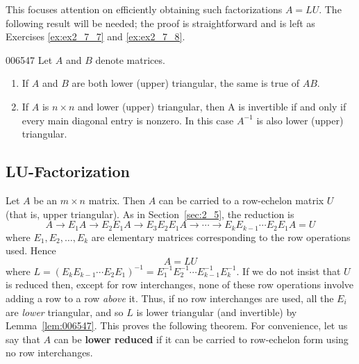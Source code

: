 This focuses attention on efficiently obtaining such factorizations $A = LU$. The following result will be needed; the proof is straightforward and is left as Exercises \ref{ex:ex2_7_7} and \ref{ex:ex2_7_8}. 

\begin{lemma}{}{006547}
Let $A$ and $B$ denote matrices.

\begin{enumerate}
\item If $A$ and $B$ are both lower (upper) triangular, the same is true of $AB$.

\item If $A$ is $n \times n$ and lower (upper) triangular, then A is invertible if and only if every main diagonal entry is nonzero. In this case $A^{-1}$ is also lower (upper) triangular.

\end{enumerate}
\end{lemma}

\subsection*{LU-Factorization}

Let $A$ be an $m \times n$ matrix. Then $A$ can be carried to a row-echelon matrix $U$ (that is, upper triangular). As in Section~\ref{sec:2_5}, the reduction is
\begin{equation*}
A \rightarrow E_{1}A \rightarrow E_{2}E_{1}A \rightarrow E_{3}E_{2}E_{1}A \rightarrow \cdots \rightarrow E_{k}E_{k-1} \cdots E_{2}E_{1}A = U
\end{equation*}
where $E_{1}, E_{2}, \dots, E_{k}$ are elementary matrices corresponding to the row operations used. Hence
\begin{equation*}
A = LU
\end{equation*}
where $L = \left(E_{k}E_{k-1} \cdots E_{2}E_{1}\right)^{-1} = E_{1}^{-1}E_{2}^{-1} \cdots E_{k-1}^{-1}E_{k}^{-1}$. If we do not insist that $U$ is reduced then, except for row interchanges, none of these row operations involve adding a row to a row \textit{above} it. Thus, if no row interchanges are used, all the $E_{i}$ are \textit{lower} triangular, and so $L$ is lower triangular (and invertible) by Lemma~\ref{lem:006547}. This proves the following theorem. For convenience, let us say that $A$ can be \textbf{lower reduced} if it can be carried to row-echelon form using no row interchanges.


